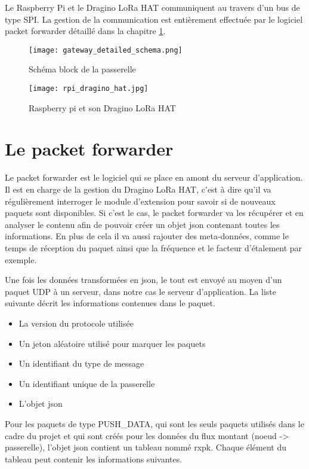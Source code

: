 Le Raspberry Pi et le Dragino LoRa HAT communiquent au travers d'un bus de type SPI. La gestion de la communication est entièrement effectuée par le logiciel packet forwarder détaillé dans la chapitre \ref{ch:packet_forwarder}.

\begin{figure}[htb]
\centering 
\texttt{[image: gateway\_detailed\_schema.png]} 
\caption{Schéma block de la passerelle}
\label{fig:gateway_schema}
\end{figure}

\begin{figure}[htb]
\centering 
\texttt{[image: rpi\_dragino\_hat.jpg]} 
\caption{Raspberry pi et son Dragino LoRa HAT}
\label{fig:rpi_lora_hat}
\end{figure}

\section{Le packet forwarder}\label{ch:packet_forwarder}

Le packet forwarder est le logiciel qui se place en amont du serveur d'application. Il est en charge de la gestion du Dragino LoRa HAT, c'est à dire qu'il va régulièrement interroger le module d'extension pour savoir si de nouveaux paquets sont disponibles. Si c'est le cas, le packet forwarder va les récupérer et en analyser le contenu afin de pouvoir créer un objet json contenant toutes les informations. En plus de cela il va aussi rajouter des meta-données, comme le temps de réception du paquet ainsi que la fréquence et le facteur d'étalement par exemple.

Une fois les données transformées en json, le tout est envoyé au moyen d'un paquet UDP à un serveur, dans notre cas le serveur d'application. La liste suivante décrit les informations contenues dans le paquet.

\begin{itemize}
\item La version du protocole utilisée
\item Un jeton aléatoire utilisé pour marquer les paquets
\item Un identifiant du type de message
\item Un identifiant unique de la passerelle
\item L'objet json
\end{itemize}

Pour les paquets de type PUSH\_DATA, qui sont les seuls paquets utilisés dans le cadre du projet et qui sont créés pour les données du flux montant (noeud -> passerelle), l'objet json contient un tableau nommé rxpk. Chaque élément du tableau peut contenir les informations suivantes.

